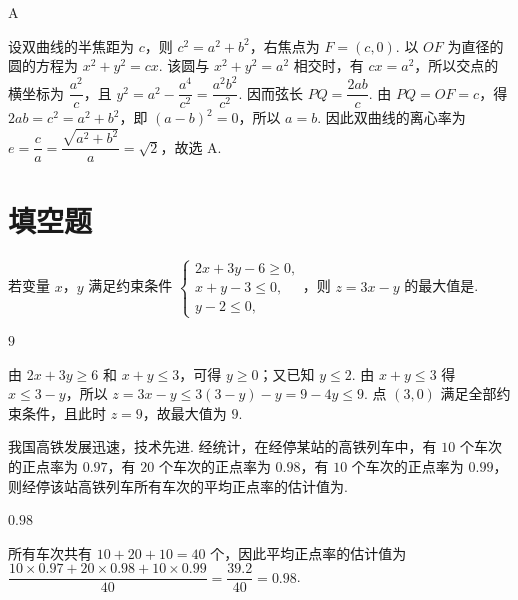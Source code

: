 \begin{answer}
A
\end{answer}

\begin{solution}
设双曲线的半焦距为 \(c\)，则 \(c^2=a^2+b^2\)，右焦点为 \(F=(c,0)\). 以 \(OF\) 为直径的圆的方程为 \(x^2+y^2=cx\). 该圆与 \(x^2+y^2=a^2\) 相交时，有 \(cx=a^2\)，所以交点的横坐标为 \(\dfrac{a^2}{c}\)，且 \(y^2=a^2-\dfrac{a^4}{c^2}=\dfrac{a^2b^2}{c^2}\). 因而弦长 \(PQ=\dfrac{2ab}{c}\). 由 \(PQ=OF=c\)，得 \(2ab=c^2=a^2+b^2\)，即 \((a-b)^2=0\)，所以 \(a=b\). 因此双曲线的离心率为 \(e=\dfrac ca=\dfrac{\sqrt{a^2+b^2}}a=\sqrt2\)，故选 A.
\end{solution}

\section{填空题}

\begin{problem}
若变量 \(x\)，\(y\) 满足约束条件 \(\begin{cases}
2x+3y-6\ge0,\\
x+y-3\le0,\\
y-2\le0,
\end{cases}\)，则 \(z=3x-y\) 的最大值是\fillinblank{}.
\end{problem}

\begin{answer}
\(9\)
\end{answer}

\begin{solution}
由 \(2x+3y\ge6\) 和 \(x+y\le3\)，可得 \(y\ge0\)；又已知 \(y\le2\). 由 \(x+y\le3\) 得 \(x\le3-y\)，所以 \(z=3x-y\le3(3-y)-y=9-4y\le9\). 点 \((3,0)\) 满足全部约束条件，且此时 \(z=9\)，故最大值为 \(9\).
\end{solution}

\begin{problem}
我国高铁发展迅速，技术先进. 经统计，在经停某站的高铁列车中，有 \(10\) 个车次的正点率为 \(0.97\)，有 \(20\) 个车次的正点率为 \(0.98\)，有 \(10\) 个车次的正点率为 \(0.99\)，则经停该站高铁列车所有车次的平均正点率的估计值为\fillinblank{}.
\end{problem}

\begin{answer}
\(0.98\)
\end{answer}

\begin{solution}
所有车次共有 \(10+20+10=40\) 个，因此平均正点率的估计值为 \(\dfrac{10\times0.97+20\times0.98+10\times0.99}{40}=\dfrac{39.2}{40}=0.98\).
\end{solution}

